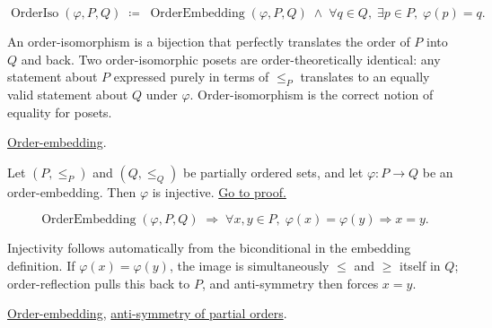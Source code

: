 \begin{remark*}
\[
\operatorname{OrderIso}(\varphi, P, Q)
\;\coloneqq\;
\operatorname{OrderEmbedding}(\varphi, P, Q)
\;\land\;
\forall q \in Q,\; \exists p \in P,\; \varphi(p) = q.
\]
\end{remark*}

\begin{remark*}[Interpretation]
An order-isomorphism is a bijection that perfectly translates the order
of $P$ into $Q$ and back.  Two order-isomorphic posets are
order-theoretically identical: any statement about $P$ expressed purely
in terms of $\leq_P$ translates to an equally valid statement about $Q$
under $\varphi$.  Order-isomorphism is the correct notion of equality
for posets.
\end{remark*}

\begin{remark*}[Dependencies]
\hyperref[def:lattice-order-embedding]{Order-embedding}.
\end{remark*}


\begin{lemma}
\label{lem:order-embedding-injective}
Let $(P, \leq_P)$ and $(Q, \leq_Q)$ be partially ordered sets, and let
$\varphi : P \to Q$ be an order-embedding.  Then $\varphi$ is injective.
\hyperref[prf:order-embedding-injective]{Go to proof.}
\end{lemma}

\begin{remark*}
\[
\operatorname{OrderEmbedding}(\varphi, P, Q)
\;\Longrightarrow\;
\forall x, y \in P,\; \varphi(x) = \varphi(y) \Rightarrow x = y.
\]
\end{remark*}

\begin{remark*}[Interpretation]
Injectivity follows automatically from the biconditional in the embedding
definition.  If $\varphi(x) = \varphi(y)$, the image is simultaneously
$\leq$ and $\geq$ itself in $Q$; order-reflection pulls this back to $P$,
and anti-symmetry then forces $x = y$.
\end{remark*}

\begin{remark*}[Dependencies]
\hyperref[def:lattice-order-embedding]{Order-embedding},
\hyperref[def:lattice-order-partial-order]{anti-symmetry of partial orders}.
\end{remark*}
